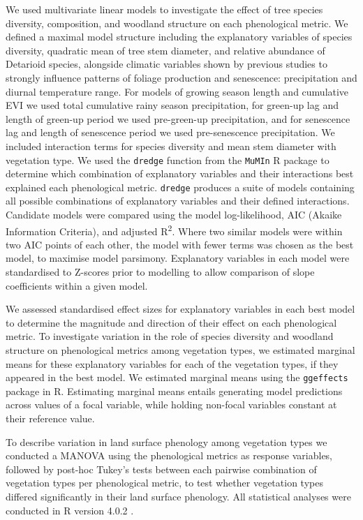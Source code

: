 \documentclass[11pt,a4paper]{article}
\begin{document}
We used multivariate linear models to investigate the effect of tree species diversity, composition, and woodland structure on each phenological metric. We defined a maximal model structure including the explanatory variables of species diversity, quadratic mean of tree stem diameter, and relative abundance of Detarioid species, alongside climatic variables shown by previous studies to strongly influence patterns of foliage production and senescence: precipitation and diurnal temperature range. For models of growing season length and cumulative EVI we used total cumulative rainy season precipitation, for green-up lag and length of green-up period we used pre-green-up precipitation, and for senescence lag and length of senescence period we used pre-senescence precipitation. We included interaction terms for species diversity and mean stem diameter with vegetation type. We used the \texttt{dredge} function from the \texttt{MuMIn} R package to determine which combination of explanatory variables and their interactions best explained each phenological metric. \texttt{dredge} produces a suite of models containing all possible combinations of explanatory variables and their defined interactions. Candidate models were compared using the model log-likelihood, AIC (Akaike Information Criteria), and adjusted R\textsuperscript{2}. Where two similar models were within two AIC points of each other, the model with fewer terms was chosen as the best model, to maximise model parsimony. Explanatory variables in each model were standardised to Z-scores prior to modelling to allow comparison of slope coefficients within a given model.

We assessed standardised effect sizes for explanatory variables in each best model to determine the magnitude and direction of their effect on each phenological metric. To investigate variation in the role of species diversity and woodland structure on phenological metrics among vegetation types, we estimated marginal means for these explanatory variables for each of the vegetation types, if they appeared in the best model. We estimated marginal means using the \texttt{ggeffects} package in R. Estimating marginal means entails generating model predictions across values of a focal variable, while holding non-focal variables constant at their reference value.

To describe variation in land surface phenology among vegetation types we conducted a MANOVA using the phenological metrics as response variables, followed by post-hoc Tukey's tests between each pairwise combination of vegetation types per phenological metric, to test whether vegetation types differed significantly in their land surface phenology. All statistical analyses were conducted in R version 4.0.2 \citep{R2020}.
\end{document}

